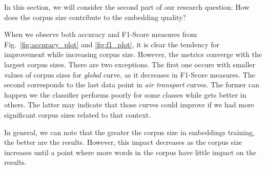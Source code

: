 In this section, we will consider the second part of our research question: How does the corpus size contribute to the embedding quality?

When we observe both accuracy and F1-Score measures from Fig.~\ref{fig:accuracy_plot} and \ref{fig:f1_plot}, it is clear the tendency for improvement while increasing corpus size. However, the metrics converge with the largest corpus sizes. There are two exceptions. The first one occurs with smaller values of corpus sizes for \textit{global} curve, as it decreases in F1-Score measures. The second corresponds to the last data point in \textit{air transport} curves. The former can happen we the classifier performs poorly for some classes while gets better in others. The latter may indicate that those curves could improve if we had more significant corpus sizes related to that context.

In general, we can note that the greater the corpus size in embeddings training, the better are the results. However, this impact decreases as the corpus size increases until a point where more words in the corpus have little impact on the results. %